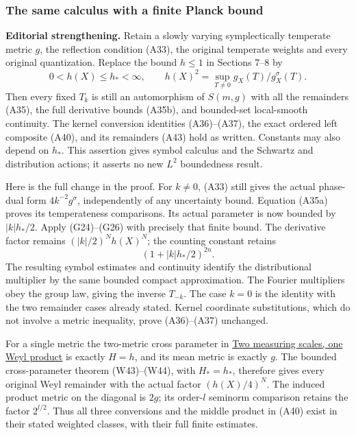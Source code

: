 \documentclass[
  11pt,
]{article}
\begin{document}
\subsubsection{The same calculus with a finite Planck
bound}\label{the-same-calculus-with-a-finite-planck-bound}

\textbf{Editorial strengthening.} Retain a slowly varying symplectically
temperate metric \(g\), the reflection condition (A33), the original
temperate weights and every original quantization. Replace the bound
\(h\le1\) in Sections 7--8 by \[
 0<h(X)\le h_*<\infty,\qquad
 h(X)^2=\sup_{T\ne0}g_X(T)/g_X^\sigma(T).
 \tag{A52}
\] Then every fixed \(T_k\) is still an automorphism of \(S(m,g)\) with
all the remainders (A35), the full derivative bounds (A35b), and
bounded-set local-smooth continuity. The kernel conversion identities
(A36)--(A37), the exact ordered left composite (A40), and its remainders
(A43) hold as written. Constants may also depend on \(h_*\). This
assertion gives symbol calculus and the Schwartz and distribution
actions; it asserts no new \(L^2\) boundedness result.

Here is the full change in the proof. For \(k\ne0\), (A33) still gives
the actual phase-dual form \(4k^{-2}g^\sigma\), independently of any
uncertainty bound. Equation (A35a) proves its temperateness comparisons.
Its actual parameter is now bounded by \(|k|h_*/2\). Apply (G24)--(G26)
with precisely that finite bound. The derivative factor remains
\((|k|/2)^Nh(X)^N\); the counting constant retains \[
 (1+|k|h_*/2)^{2n}.
 \tag{A53}
\] The resulting symbol estimates and continuity identify the
distributional multiplier by the same bounded compact approximation. The
Fourier multipliers obey the group law, giving the inverse \(T_{-k}\).
The case \(k=0\) is the identity with the two remainder cases already
stated. Kernel coordinate substitutions, which do not involve a metric
inequality, prove (A36)--(A37) unchanged.

For a single metric the two-metric cross parameter in
\href{weyl-metric-products.pdf}{Two measuring scales, one Weyl product}
is exactly \(H=h\), and its mean metric is exactly \(g\). The bounded
cross-parameter theorem (W43)--(W44), with \(H_*=h_*\), therefore gives
every original Weyl remainder with the actual factor \((h(X)/4)^N\). The
induced product metric on the diagonal is \(2g\); its order-\(l\)
seminorm comparison retains the factor \(2^{l/2}\). Thus all three
conversions and the middle product in (A40) exist in their stated
weighted classes, with their full finite estimates.
\end{document}
